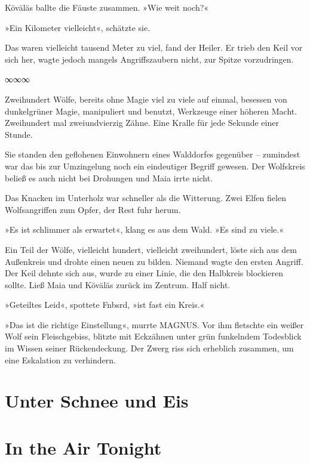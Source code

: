 Köväläs ballte die Fäuste zusammen. »Wie weit noch?«

»Ein Kilometer vielleicht«, schätzte sie.

Das waren vielleicht tausend Meter zu viel, fand der Heiler. Er trieb den Keil vor sich her, wagte jedoch mangels Angriffszaubern nicht, zur Spitze vorzudringen.

\begin{center}
∞∞∞
\end{center}

Zweihundert Wölfe, bereits ohne Magie viel zu viele auf einmal, besessen von dunkelgrüner Magie, manipuliert und benutzt, Werkzeuge einer höheren Macht. Zweihundert mal zweiundvierzig Zähne. Eine Kralle für jede Sekunde einer Stunde.

Sie standen den geflohenen Einwohnern eines Walddorfes gegenüber – zumindest war das bis zur Umzingelung noch ein eindeutiger Begriff gewesen. Der Wolfskreis beließ es auch nicht bei Drohungen und Maia irrte nicht.

Das Knacken im Unterholz war schneller als die Witterung. Zwei Elfen fielen Wolfsangriffen zum Opfer, der Rest fuhr herum.

»Es ist schlimmer als erwartet«, klang es aus dem Wald. »Es sind zu viele.«

Ein Teil der Wölfe, vielleicht hundert, vielleicht zweihundert, löste sich aus dem Außenkreis und drohte einen neuen zu bilden. Niemand wagte den ersten Angriff. Der Keil dehnte sich aus, wurde zu einer Linie, die den Halbkreis blockieren sollte. Ließ Maia und Köväläs zurück im Zentrum. Half nicht.

»Geteiltes Leid«, spottete Fnbsrd, »ist fast ein Kreis.«

»Das ist die richtige Einstellung«, murrte MAGNUS. Vor ihm fletschte ein weißer Wolf sein Fleischgebiss, blitzte mit Eckzähnen unter grün funkelndem Todesblick im Wissen seiner Rückendeckung. Der Zwerg riss sich erheblich zusammen, um eine Eskalation zu verhindern.


\chapter{Unter Schnee und Eis} %



\chapter{In the Air Tonight}

